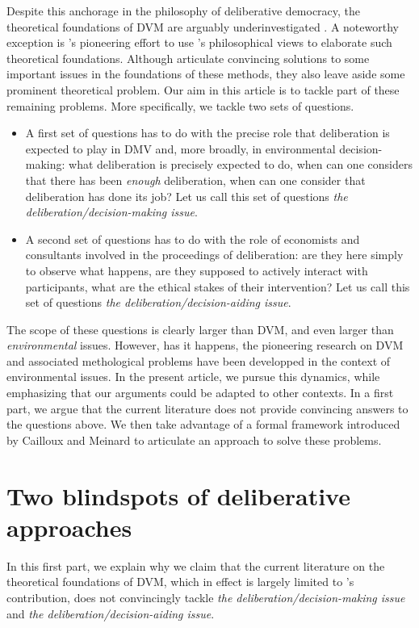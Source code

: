 \documentclass[version=last, pagesize, twoside=off, bibliography=totoc, DIV=calc, fontsize=14pt, a4paper, french, english]{scrartcl}
\begin{document}
Despite this anchorage in the philosophy of deliberative democracy, the theoretical foundations of DVM are arguably underinvestigated \citep{bartkowski_economic_2017,bartkowski_beyond_2018,bunse_what_2015,kenter_what_2015}. A noteworthy exception is \citet{bartkowski_beyond_2018}'s pioneering effort to use \citet{sen_idea_2009}'s philosophical views to elaborate such theoretical foundations. Although \citet{bartkowski_beyond_2018} articulate convincing solutions to some important issues in the foundations of these methods, they also leave aside some prominent theoretical problem. Our aim in this article is to tackle part of these remaining problems. More specifically, we tackle two sets of questions.
\begin{itemize}
\item A first set of questions has to do with the precise role that deliberation is expected to play in DMV and, more broadly, in environmental decision-making: what deliberation is precisely expected to do, when can one considers that there has been \emph{enough} deliberation, when can one consider that deliberation has done its job? Let us call this set of questions \emph{the deliberation/decision-making issue}.
\item A second set of questions has to do with the role of economists and consultants involved in the proceedings of deliberation: are they here simply to observe what happens, are they supposed to actively interact with participants, what are the ethical stakes of their intervention? Let us call this set of questions \emph{the deliberation/decision-aiding issue}.
\end{itemize}
The scope of these questions is clearly larger than DVM, and even larger than \emph{environmental} issues. However, has it happens, the pioneering research on DVM and associated methological problems have been developped in the context of environmental issues. In the present article, we pursue this dynamics, while emphasizing that our arguments could be adapted to other contexts.
In a first part, we argue that the current literature does not provide convincing answers to the questions above. We then take advantage of a formal framework introduced by Cailloux and Meinard to articulate an approach to solve these problems.

\section{Two blindspots of deliberative approaches}
In this first part, we explain why we claim that the current literature on the theoretical foundations of DVM, which in effect is largely limited to \citet{bartkowski_beyond_2018}'s contribution, does not convincingly tackle \emph{the deliberation/decision-making issue} and \emph{the deliberation/decision-aiding issue}.
\end{document}
